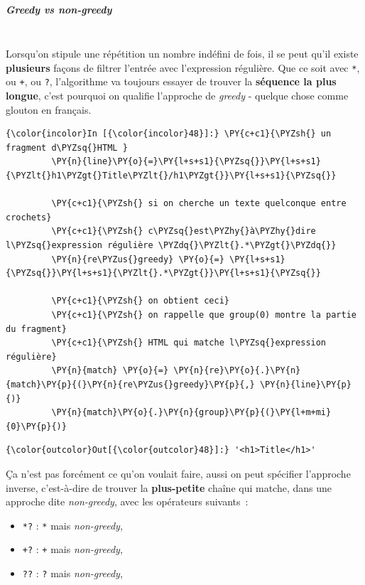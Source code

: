     \hypertarget{greedy-vs-non-greedy}{%
\subparagraph{\texorpdfstring{Greedy \emph{vs}
non-greedy}{Greedy vs non-greedy}\\\\}\label{greedy-vs-non-greedy}}

    Lorsqu'on stipule une répétition un nombre indéfini de fois, il se peut
qu'il existe \textbf{plusieurs} façons de filtrer l'entrée avec
l'expression régulière. Que ce soit avec \texttt{*}, ou \texttt{+}, ou
\texttt{?}, l'algorithme va toujours essayer de trouver la
\textbf{séquence la plus longue}, c'est pourquoi on qualifie l'approche
de \emph{greedy} - quelque chose comme glouton en français.

    \begin{Verbatim}[commandchars=\\\{\}]
{\color{incolor}In [{\color{incolor}48}]:} \PY{c+c1}{\PYZsh{} un fragment d\PYZsq{}HTML }
         \PY{n}{line}\PY{o}{=}\PY{l+s+s1}{\PYZsq{}}\PY{l+s+s1}{\PYZlt{}h1\PYZgt{}Title\PYZlt{}/h1\PYZgt{}}\PY{l+s+s1}{\PYZsq{}}
         
         \PY{c+c1}{\PYZsh{} si on cherche un texte quelconque entre crochets}
         \PY{c+c1}{\PYZsh{} c\PYZsq{}est\PYZhy{}à\PYZhy{}dire l\PYZsq{}expression régulière \PYZdq{}\PYZlt{}.*\PYZgt{}\PYZdq{}}
         \PY{n}{re\PYZus{}greedy} \PY{o}{=} \PY{l+s+s1}{\PYZsq{}}\PY{l+s+s1}{\PYZlt{}.*\PYZgt{}}\PY{l+s+s1}{\PYZsq{}}
         
         \PY{c+c1}{\PYZsh{} on obtient ceci}
         \PY{c+c1}{\PYZsh{} on rappelle que group(0) montre la partie du fragment}
         \PY{c+c1}{\PYZsh{} HTML qui matche l\PYZsq{}expression régulière}
         \PY{n}{match} \PY{o}{=} \PY{n}{re}\PY{o}{.}\PY{n}{match}\PY{p}{(}\PY{n}{re\PYZus{}greedy}\PY{p}{,} \PY{n}{line}\PY{p}{)}
         \PY{n}{match}\PY{o}{.}\PY{n}{group}\PY{p}{(}\PY{l+m+mi}{0}\PY{p}{)}
\end{Verbatim}


\begin{Verbatim}[commandchars=\\\{\}]
{\color{outcolor}Out[{\color{outcolor}48}]:} '<h1>Title</h1>'
\end{Verbatim}
            
    Ça n'est pas forcément ce qu'on voulait faire, aussi on peut spécifier
l'approche inverse, c'est-à-dire de trouver la \textbf{plus-petite}
chaîne qui matche, dans une approche dite \emph{non-greedy}, avec les
opérateurs suivants~:

\begin{itemize}
	\item 
	\texttt{*?} : \texttt{*} mais \emph{non-greedy},
	\item
	\texttt{+?} : \texttt{+} mais \emph{non-greedy},
	\item 
	\texttt{??} : \texttt{?} mais \emph{non-greedy},
\end{itemize}

